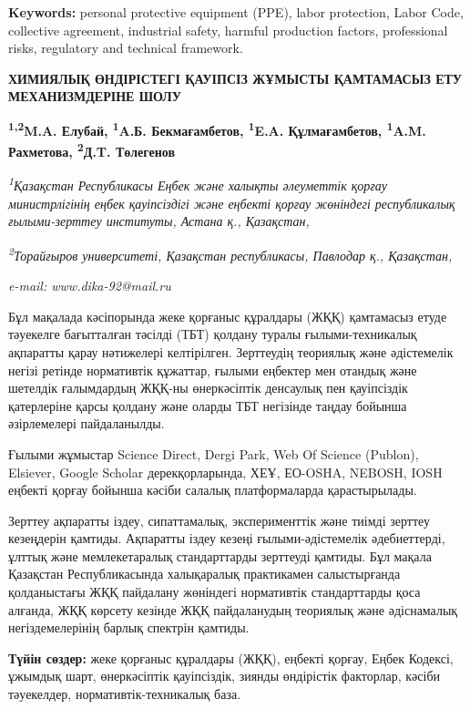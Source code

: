 {\bfseries Keywords:} personal protective equipment (PPE), labor
protection, Labor Code, collective agreement, industrial safety, harmful
production factors, professional risks, regulatory and technical
framework.

\begin{articleheader}
{\bfseries ХИМИЯЛЫҚ ӨНДІРІСТЕГІ ҚАУІПСІЗ ЖҰМЫСТЫ ҚАМТАМАСЫЗ ЕТУ МЕХАНИЗМДЕРІНЕ ШОЛУ}

{\bfseries
\textsuperscript{1,2}M.A. Елубай,
\textsuperscript{1}A.Б. Бекмағамбетов,
\textsuperscript{1}E.A. Құлмағамбетов,
\textsuperscript{1}A.M. Рахметова,
\textsuperscript{2}Д.T. Төлегенов\textsuperscript{\envelope }}
\end{articleheader}

\begin{affiliation}
\emph{\textsuperscript{1}Қазақстан Республикасы Еңбек және халықты әлеуметтік қорғау министрлігінің еңбек қауіпсіздігі
және еңбекті қорғау жөніндегі республикалық ғылыми-зерттеу институты, Астана қ., Қазақстан,}

\emph{\textsuperscript{2}Торайғыров университеті, Қазақстан республикасы, Павлодар қ., Қазақстан,}

\emph{e-mail: www.dika-92@mail.ru}
\end{affiliation}

Бұл мақалада кәсіпорында жеке қорғаныс құралдары (ЖҚҚ) қамтамасыз етуде
тәуекелге бағытталған тәсілді (ТБТ) қолдану туралы ғылыми-техникалық
ақпаратты қарау нәтижелері келтірілген. Зерттеудің теориялық және
әдістемелік негізі ретінде нормативтік құжаттар, ғылыми еңбектер мен
отандық және шетелдік ғалымдардың ЖҚҚ-ны өнеркәсіптік денсаулық пен
қауіпсіздік қатерлеріне қарсы қолдану және оларды ТБТ негізінде таңдау
бойынша әзірлемелері пайдаланылды.

Ғылыми жұмыстар Science Direct, Dergi Park, Web Of Science (Publon),
Elsiever, Google Scholar дерекқорларында, ХЕҰ, ЕО-OSHA, NEBOSH, IOSH
еңбекті қорғау бойынша кәсіби салалық платформаларда қарастырылады.

Зерттеу ақпаратты іздеу, сипаттамалық, эксперименттік және тиімді
зерттеу кезеңдерін қамтиды. Ақпаратты іздеу кезеңі ғылыми-әдістемелік
әдебиеттерді, ұлттық және мемлекетаралық стандарттарды зерттеуді
қамтиды. Бұл мақала Қазақстан Республикасында халықаралық практикамен
салыстырғанда қолданыстағы ЖҚҚ пайдалану жөніндегі нормативтік
стандарттарды қоса алғанда, ЖҚҚ көрсету кезінде ЖҚҚ пайдаланудың
теориялық және әдіснамалық негіздемелерінің барлық спектрін қамтиды.

{\bfseries Түйін сөздер:} жеке қорғаныс құралдары (ЖҚҚ), еңбекті қорғау,
Еңбек Кодексі, ұжымдық шарт, өнеркәсіптік қауіпсіздік, зиянды өндірістік
факторлар, кәсіби тәуекелдер, нормативтік-техникалық база.

